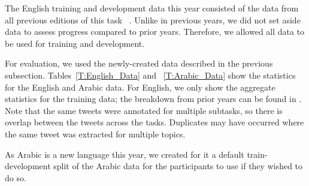 \documentclass[11pt,a4paper]{article}
\begin{document}
The English training and development data this year consisted of the data from all previous editions of this task ~\cite{Nakov:2013ty,rosenthal-EtAl:2014:SemEval,rosenthal-EtAl:2015:SemEval,Nakov:2016rm}. Unlike in previous years, we did not set aside data to assess progress compared to prior years. Therefore, we allowed all data to be used for training and development.

\noindent For evaluation, we used the newly-created data described in the previous subsection. Tables~\ref{T:English_Data} and ~\ref{T:Arabic_Data} show the statistics for the English and Arabic data. For English, we only show the aggregate statistics for the training data; the breakdown from prior years can be found in \cite{nakov-EtAl:2016:SemEval1}. Note that the same tweets were annotated for multiple subtasks, so there is overlap between the tweets across the tasks. Duplicates may have occurred where the same tweet was extracted for multiple topics.


As Arabic is a new language this year, we created for it a default train-development split of the Arabic data for the participants to use if they wished to do so. 
\end{document}
